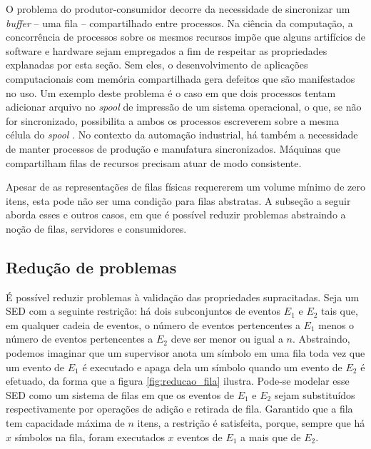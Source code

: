 O problema do produtor-consumidor decorre da necessidade de sincronizar um \textit{buffer} -- uma fila -- compartilhado entre processos. Na ciência da computação, a concorrência de processos sobre os mesmos recursos impõe que alguns artifícios de software e hardware sejam empregados a fim de respeitar as propriedades explanadas por esta seção. Sem eles, o desenvolvimento de aplicações computacionais com memória compartilhada gera defeitos que são manifestados no uso. Um exemplo deste problema é o caso em que dois processos tentam adicionar arquivo no \textit{spool} de impressão de um sistema operacional, o que, se não for sincronizado, possibilita a ambos os processos escreverem sobre a mesma célula do \textit{spool} \cite{tanenbaum}. No contexto da automação industrial, há também a necessidade de manter processos de produção e manufatura sincronizados. Máquinas que compartilham filas de recursos precisam atuar de modo consistente. 

Apesar de as representações de filas físicas requererem um volume mínimo de zero itens, esta pode não ser uma condição para filas abstratas. A subseção a seguir aborda esses e outros casos, em que é possível reduzir problemas abstraindo a noção de filas, servidores e consumidores.

\subsection{Redução de problemas}

É possível reduzir problemas à validação das propriedades supracitadas. Seja um SED com a seguinte restrição: há dois subconjuntos de eventos $E_1$ e $E_2$ tais que, em qualquer cadeia de eventos, o número de eventos pertencentes a $E_1$ menos o número de eventos pertencentes a $E_2$ deve ser menor ou igual a $n$. Abstraindo, podemos imaginar que um supervisor anota um símbolo em uma fila toda vez que um evento de $E_1$ é executado e apaga dela um símbolo quando um evento de $E_2$ é efetuado, da forma que a figura \ref{fig:reducao_fila} ilustra. Pode-se modelar esse SED como um sistema de filas em que os eventos de $E_1$ e $E_2$ sejam substituídos respectivamente por operações de adição e retirada de fila. Garantido que a fila tem capacidade máxima de $n$ itens, a restrição é satisfeita, porque, sempre que há $x$ símbolos na fila, foram executados $x$ eventos de $E_1$ a mais que de $E_2$.


